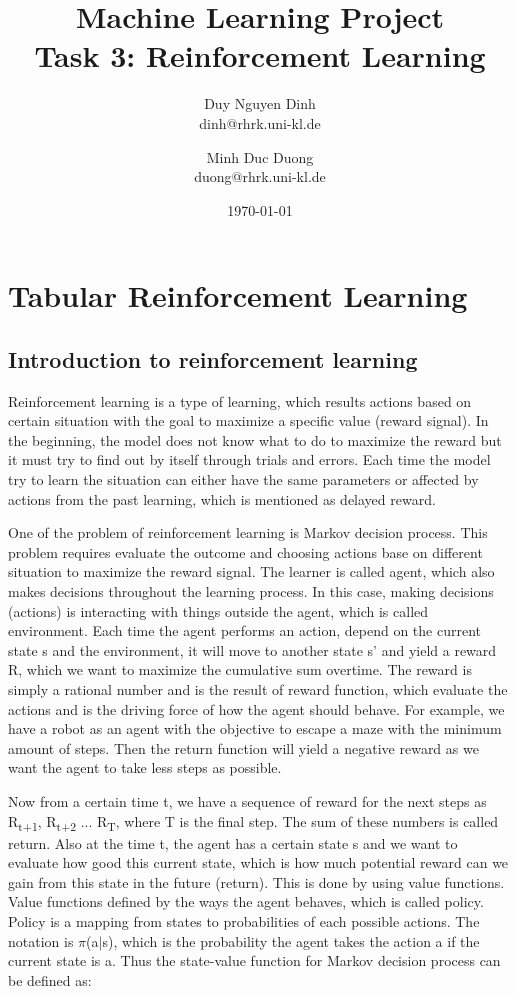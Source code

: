 \documentclass[11pt]{article}
\title{Machine Learning Project\\Task 3: Reinforcement Learning}
\author{Duy Nguyen Dinh \\ dinh@rhrk.uni-kl.de\and
	Minh Duc Duong\\ duong@rhrk.uni-kl.de\and
    }
\date{\today}
\begin{document}
\maketitle

\section{Tabular Reinforcement Learning}

\subsection{Introduction to reinforcement learning}
Reinforcement learning is a type of learning, which results actions based on certain situation with the goal to maximize a specific value (reward signal). In the beginning, the model does not know what to do to maximize the reward but it must try to find out by itself through trials and errors. Each time the model try to learn the situation can either have the same parameters or affected by actions from the past learning, which is mentioned as delayed reward.

One of the problem of reinforcement learning is Markov decision process. This problem requires evaluate the outcome and choosing actions base on different situation to maximize the reward signal. The learner is called agent, which also makes decisions throughout the learning process. In this case, making decisions (actions) is interacting with things outside the agent, which is called environment. Each time the agent performs an action, depend on the current state s and the environment, it will move to another state s' and yield a reward R, which we want to maximize the cumulative sum overtime. The reward is simply a rational number and is the result of reward function, which evaluate the actions and is the driving force of how the agent should behave. For example, we have a robot as an agent with the objective to escape a maze with the minimum amount of steps. Then the return function will yield a negative reward as we want the agent to take less steps as possible.

Now from a certain time t, we have a sequence of reward for the next steps as R\textsubscript{t+1},  R\textsubscript{t+2} ... R\textsubscript{T}, where T is the final step. The sum of these numbers is called return. Also at the time t, the agent has a certain state s and we want to evaluate how good this current state, which is how much potential reward can we gain from this state in the future (return). This is done by using value functions. Value functions defined by the ways the agent behaves, which is called policy. Policy is a mapping from states to probabilities of each possible actions. The notation is $\pi$(a$\vert$s), which is the probability the agent takes the action a if the current state is a. Thus the state-value function for Markov decision process can be defined as:
\end{document}
